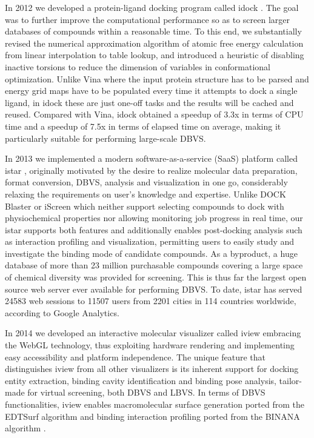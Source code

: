 \documentclass[a4paper,12pt]{article}
\begin{document}
In 2012 we developed a protein-ligand docking program called idock \citep{1153}. The goal was to further improve the computational performance so as to screen larger databases of compounds within a reasonable time. To this end, we substantially revised the numerical approximation algorithm of atomic free energy calculation from linear interpolation to table lookup, and introduced a heuristic of disabling inactive torsions to reduce the dimension of variables in conformational optimization. Unlike Vina where the input protein structure has to be parsed and energy grid maps have to be populated every time it attempts to dock a single ligand, in idock these are just one-off tasks and the results will be cached and reused. Compared with Vina, idock obtained a speedup of 3.3x in terms of CPU time and a speedup of 7.5x in terms of elapsed time on average, making it particularly suitable for performing large-scale DBVS.

In 2013 we implemented a modern software-as-a-service (SaaS) platform called istar \citep{1362}, originally motivated by the desire to realize molecular data preparation, format conversion, DBVS, analysis and visualization in one go, considerably relaxing the requirements on user's knowledge and expertise. Unlike DOCK Blaster or iScreen which neither support selecting compounds to dock with physiochemical properties nor allowing monitoring job progress in real time, our istar supports both features and additionally enables post-docking analysis such as interaction profiling and visualization, permitting users to easily study and investigate the binding mode of candidate compounds. As a byproduct, a huge database of more than 23 million purchasable compounds covering a large space of chemical diversity was provided for screening. This is thus far the largest open source web server ever available for performing DBVS. To date, istar has served 24583 web sessions to 11507 users from 2201 cities in 114 countries worldwide, according to Google Analytics.

In 2014 we developed an interactive molecular visualizer called iview \citep{1366,1265} embracing the WebGL technology, thus exploiting hardware rendering and implementing easy accessibility and platform independence. The unique feature that distinguishes iview from all other visualizers is its inherent support for docking entity extraction, binding cavity identification and binding pose analysis, tailor-made for virtual screening, both DBVS and LBVS. In terms of DBVS functionalities, iview enables macromolecular surface generation ported from the EDTSurf algorithm \citep{1297} and binding interaction profiling ported from the BINANA algorithm \citep{1413}.
\end{document}
